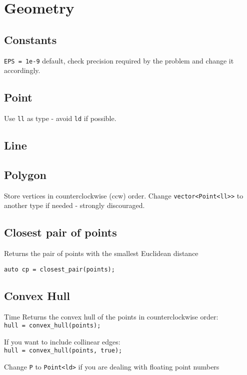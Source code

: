\section{Geometry}

\subsection{Constants}
\verb|EPS = 1e-9| default, check precision required by the problem and
change it accordingly.


\subsection{Point}
Use \verb|ll| as type - avoid \verb|ld| if possible.

\subsection{Line}

\subsection{Polygon}
Store vertices in counterclockwise (ccw) order.
Change \verb|vector<Point<ll>>| to another type if needed - strongly discouraged.

\subsection{Closest pair of points}

Returns the pair of points with the smallest Euclidean distance

\verb|auto cp = closest_pair(points);|


\subsection{Convex Hull}
 Time
Returns the convex hull of the points in counterclockwise order: \\
\verb|hull = convex_hull(points);|

If you want to include collinear edges: \\
\verb|hull = convex_hull(points, true);|

Change \verb|P| to \verb|Point<ld>| if you are dealing with floating point numbers


